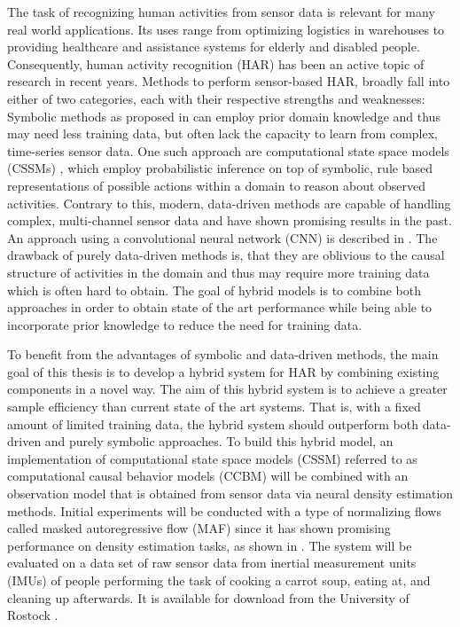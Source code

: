 \documentclass[11pt,titlepage,oneside,openany]{book}
\begin{document}

The task of recognizing human activities from sensor data is relevant for many real world applications. Its uses range from optimizing logistics in warehouses to providing healthcare and assistance systems for elderly and disabled people. Consequently, human activity recognition (HAR) has been an active topic of research in recent years. Methods to perform sensor-based HAR, broadly fall into either of two categories, each with their respective strengths and weaknesses: Symbolic methods as proposed in \cite{kruger_computational_2014, ramirez_goal_2011} can employ prior domain knowledge and thus may need less training data, but often lack the capacity to learn from complex, time-series sensor data. One such approach are computational state space models (CSSMs) \cite{kruger_computational_2014}, which employ probabilistic inference on top of symbolic, rule based representations of possible actions within a domain to reason about observed activities. Contrary to this, modern, data-driven methods are capable of handling complex, multi-channel sensor data and have shown promising results in the past. An approach using a convolutional neural network (CNN) is described in \cite{moya_rueda_convolutional_2018}. The drawback of purely data-driven methods is, that they are oblivious to the causal structure of activities in the domain and thus may require more training data which is often hard to obtain. The goal of hybrid models is to combine both approaches in order to obtain state of the art performance while being able to incorporate prior knowledge to reduce the need for training data.

To benefit from the advantages of symbolic and data-driven methods, the main goal of this thesis is to develop a hybrid system for HAR by combining existing components in a novel way. The aim of this hybrid system is to achieve a greater sample efficiency than current state of the art systems. That is, with a fixed amount of limited training data, the hybrid system should outperform both data-driven and purely symbolic approaches. To build this hybrid model, an implementation of computational state space models (CSSM) \cite{kruger_computational_2014} referred to as computational causal behavior models (CCBM) will be combined with an observation model that is obtained from sensor data via neural density estimation methods. Initial experiments will be conducted with a type of normalizing flows called masked autoregressive flow (MAF) \cite{papamakarios_masked_2017} since it has shown promising performance on density estimation tasks, as shown in \cite{kobyzev_normalizing_2021}. The system will be evaluated on a data set of raw sensor data from inertial measurement units (IMUs) of people performing the task of cooking a carrot soup, eating at, and cleaning up afterwards. It is available for download from the University of Rostock \cite{kruger2017recognising}. %
\end{document}
